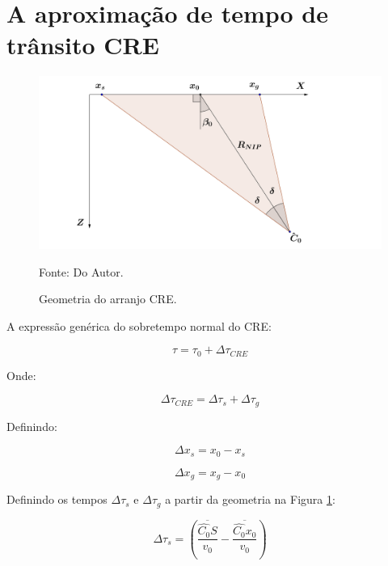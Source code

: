 \documentclass[a4paper, 12pt]{article}
\begin{document}
\section{A aproximação de tempo de trânsito CRE}

\begin{figure}[H]
\caption{Geometria do arranjo CRE.}
\begin{center}
\includegraphics[scale=0.5]{images/creGeom.png}
\vspace{-0.3cm}
\end{center}
\begin{center}
 Fonte: Do Autor.
\end{center}
\label{fig:1.1}
\end{figure}

A expressão genérica do sobretempo normal do CRE:

\begin{equation}
\label{eq:1.1}
\tau = \tau_0 + \Delta \tau_{CRE}
\end{equation}

Onde:

\begin{equation}
\label{eq:1.2}
\Delta \tau_{CRE} = \Delta \tau_s + \Delta \tau_g
\end{equation}

Definindo:

\begin{equation}
\label{eq:1.3}
\Delta x_s = x_0 - x_s
\end{equation}

\begin{equation}
\label{eq:1.4}
\Delta x_g = x_g - x_0
\end{equation}

Definindo os tempos $\Delta \tau_s$ e $\Delta \tau_g$ a partir da geometria na Figura \ref{fig:1.1}:

\begin{equation}
\label{eq:1.5}
\Delta \tau_s = \left( \frac{\overline{\hat{C_0}S}}{v_0} - \frac{\overline{\hat{C_0}x_0}}{v_0} \right)
\end{equation}
\end{document}

